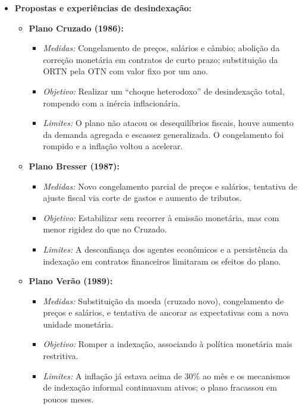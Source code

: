 \documentclass{sciposter}
\begin{document}
\begin{multicols}{3}
\begin{itemize}
    \item \textbf{ Propostas e experiências de desindexação:}

    \begin{itemize}
        \item \textbf{Plano Cruzado (1986):}
        \begin{itemize}
            \item \textit{Medidas:} Congelamento de preços, salários e câmbio; abolição da correção monetária em contratos de curto prazo; substituição da ORTN pela OTN com valor fixo por um ano.
            \item \textit{Objetivo:} Realizar um “choque heterodoxo” de desindexação total, rompendo com a inércia inflacionária.
            \item \textit{Limites:} O plano não atacou os desequilíbrios fiscais, houve aumento da demanda agregada e escassez generalizada. O congelamento foi rompido e a inflação voltou a acelerar.
        \end{itemize}

        \item \textbf{Plano Bresser (1987):}
        \begin{itemize}
            \item \textit{Medidas:} Novo congelamento parcial de preços e salários, tentativa de ajuste fiscal via corte de gastos e aumento de tributos.
            \item \textit{Objetivo:} Estabilizar sem recorrer à emissão monetária, mas com menor rigidez do que no Cruzado.
            \item \textit{Limites:} A desconfiança dos agentes econômicos e a persistência da indexação em contratos financeiros limitaram os efeitos do plano.
        \end{itemize}

        \item \textbf{Plano Verão (1989):}
        \begin{itemize}
            \item \textit{Medidas:} Substituição da moeda (cruzado novo), congelamento de preços e salários, e tentativa de ancorar as expectativas com a nova unidade monetária.
            \item \textit{Objetivo:} Romper a indexação, associando à política monetária mais restritiva.
            \item \textit{Limites:} A inflação já estava acima de 30\% ao mês e os mecanismos de indexação informal continuavam ativos; o plano fracassou em poucos meses.
        \end{itemize}
    \end{itemize}


\end{itemize}
\end{multicols}
\end{document}
